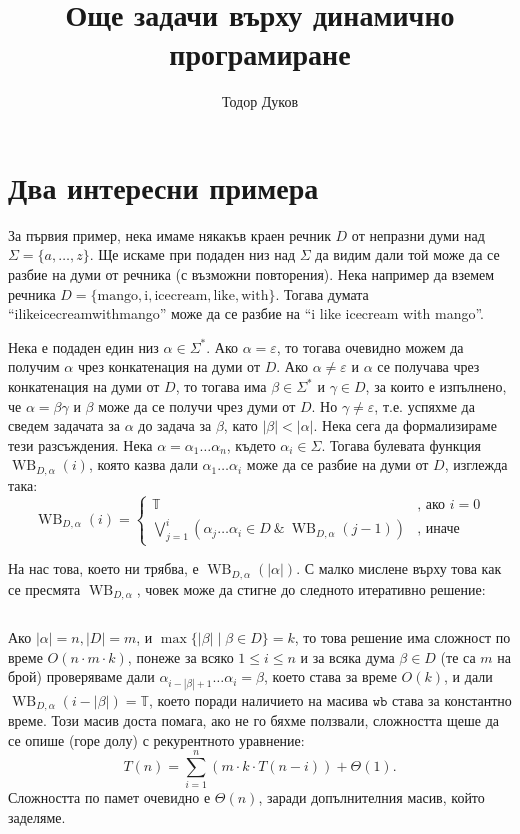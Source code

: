 \documentclass{article}
\title{Още задачи върху динамично програмиране}
\author{Тодор Дуков}
\date{}
\newcommand{\T}{\mathbb{T}}
\theoremstyle{definition}
\theoremstyle{plain}
\theoremstyle{remark}
\theoremstyle{definition}
\begin{document}
\maketitle

\section*{Два интересни примера}

За първия пример, нека имаме някакъв краен речник $D$ от непразни думи над $\Sigma = \{ a, \dots, z \}$.
Ще искаме при подаден низ над $\Sigma$ да видим дали той може да се разбие на думи от речника (с възможни повторения).
Нека например да вземем речника $D = \{ \text{mango}, \text{i}, \text{icecream}, \text{like}, \text{with} \}$.
Тогава думата ``ilikeicecreamwithmango'' може да се разбие на ``i like icecream with mango''.

Нека е подаден един низ $\alpha \in \Sigma^*$.
Ако $\alpha = \varepsilon$, то тогава очевидно можем да получим $\alpha$ чрез конкатенация на думи от $D$.
Ако $\alpha \neq \varepsilon$ и $\alpha$ се получава чрез конкатенация на думи от $D$, то тогава има $\beta \in \Sigma^*$ и $\gamma \in D$, за които е изпълнено, че $\alpha = \beta \gamma$ и $\beta$ може да се получи чрез думи от $D$.
Но $\gamma \neq \varepsilon$, т.е. успяхме да сведем задачата за $\alpha$ до задача за $\beta$, като $|\beta| < |\alpha|$.
Нека сега да формализираме тези разсъждения.
Нека $\alpha = \alpha_1 \dots \alpha_n$, където $\alpha_i \in \Sigma$.
Тогава булевата функция $\operatorname{WB}_{D, \alpha}(i)$, която казва дали $\alpha_1 \dots \alpha_i$ може да се разбие на думи от $D$, изглежда така:
\[
  \operatorname{WB}_{D, \alpha}(i) = \begin{cases}
    \T                                                                                                     & \text{, ако } i = 0 \\
    \bigvee\limits_{j = 1}^i (\alpha_j \dots \alpha_i \in D \: \& \: \operatorname{WB}_{D, \alpha}(j - 1)) & \text{, иначе}
  \end{cases}
\]

На нас това, което ни трябва, е $\operatorname{WB}_{D, \alpha}(|\alpha|)$.
С малко мислене върху това как се пресмята $\operatorname{WB}_{D, \alpha}$, човек може да стигне до следното итеративно решение:
\inputminted[linenos]{c++}{algorithms/word_break.cpp}
Ако $|\alpha| = n, |D| = m$, и $\max \{ |\beta| \mid \beta \in D \} = k$, то това решение има сложност по време $O(n \cdot m \cdot k)$, понеже за всяко $1 \leq i \leq n$ и за всяка дума $\beta \in D$ (те са $m$ на брой) проверяваме дали $\alpha_{i - |\beta| + 1} \dots \alpha_i = \beta$, което става за време $O(k)$, и дали $\operatorname{WB}_{D, \alpha}(i - |\beta|) = \T$, което поради наличието на масива $\mathtt{wb}$ става за константно време.
Този масив доста помага, ако не го бяхме ползвали, сложността щеше да се опише (горе долу) с рекурентното уравнение:
\[
  T(n) = \sum\limits_{i = 1}^{n} (m \cdot k \cdot T(n - i)) + \Theta(1).
\]
Сложността по памет очевидно е $\Theta(n)$, заради допълнителния масив, който заделяме.
\end{document}
